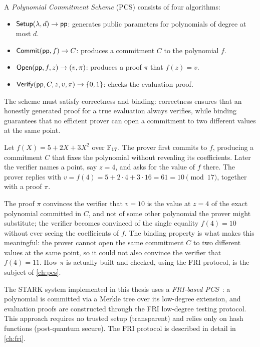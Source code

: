 \begin{definition}
\label{def:pcs}
A \emph{Polynomial Commitment Scheme} (PCS) consists of four
algorithms:
\begin{itemize}
  \item $\mathsf{Setup}(\lambda, d) \to \mathsf{pp}$: generates public
    parameters for polynomials of degree at most $d$.
  \item $\mathsf{Commit}(\mathsf{pp}, f) \to C$: produces a commitment $C$
    to the polynomial $f$.
  \item $\mathsf{Open}(\mathsf{pp}, f, z) \to (v, \pi)$: produces a proof
    $\pi$ that $f(z) = v$.
  \item $\mathsf{Verify}(\mathsf{pp}, C, z, v, \pi) \to \{0,1\}$: checks
    the evaluation proof.
\end{itemize}
The scheme must satisfy correctness and binding: correctness ensures
that an honestly generated proof for a true evaluation always verifies, 
while binding guarantees that no efficient prover can open a commitment
to two different values at the same point.
\end{definition}

 
\begin{example}
\label{ex:pcs}
Let $f(X) = 5 + 2X + 3X^2$ over $\mathbb{F}_{17}$. The prover first commits to
$f$, producing a commitment $C$ that fixes the polynomial without
revealing its coefficients. Later the verifier names a point, say
$z = 4$, and asks for the value of $f$ there. The prover replies with
$v = f(4) = 5 + 2\cdot 4 + 3\cdot 16 = 61 = 10 \pmod{17}$, together with
a proof $\pi$.
 
The proof $\pi$ convinces the verifier that $v = 10$ is the value at
$z = 4$ of the exact polynomial committed in $C$, and not of some other
polynomial the prover might substitute; the verifier becomes convinced
of the single equality $f(4) = 10$ without ever seeing the coefficients
of $f$. The binding property is what makes this meaningful: the prover
cannot open the same commitment $C$ to two different values at the same
point, so it could not also convince the verifier that $f(4) = 11$. How
$\pi$ is actually built and checked, using the FRI protocol, is the
subject of \cref{ch:pcs}.
\end{example}

The STARK system implemented in this thesis uses a \emph{FRI-based
PCS}~\cite{BBHR18}: a polynomial is committed via a Merkle tree over
its low-degree extension, and evaluation proofs are constructed
through the FRI low-degree testing protocol. This approach requires no
trusted setup (transparent) and relies only on hash functions
(post-quantum secure). The FRI protocol is described in detail in
\cref{ch:fri}.